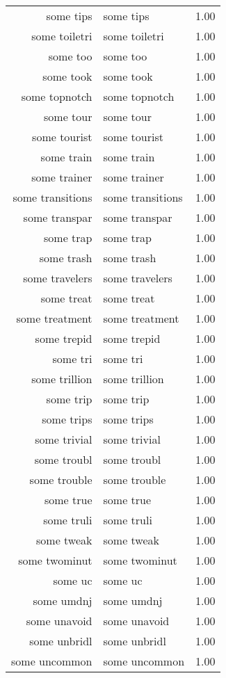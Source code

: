 \begin{table}[ht]
\begin{tabular}{rlr}
  some tips & some tips & 1.00 \\ 
  some toiletri & some toiletri & 1.00 \\ 
  some too & some too & 1.00 \\ 
  some took & some took & 1.00 \\ 
  some topnotch & some topnotch & 1.00 \\ 
  some tour & some tour & 1.00 \\ 
  some tourist & some tourist & 1.00 \\ 
  some train & some train & 1.00 \\ 
  some trainer & some trainer & 1.00 \\ 
  some transitions & some transitions & 1.00 \\ 
  some transpar & some transpar & 1.00 \\ 
  some trap & some trap & 1.00 \\ 
  some trash & some trash & 1.00 \\ 
  some travelers & some travelers & 1.00 \\ 
  some treat & some treat & 1.00 \\ 
  some treatment & some treatment & 1.00 \\ 
  some trepid & some trepid & 1.00 \\ 
  some tri & some tri & 1.00 \\ 
  some trillion & some trillion & 1.00 \\ 
  some trip & some trip & 1.00 \\ 
  some trips & some trips & 1.00 \\ 
  some trivial & some trivial & 1.00 \\ 
  some troubl & some troubl & 1.00 \\ 
  some trouble & some trouble & 1.00 \\ 
  some true & some true & 1.00 \\ 
  some truli & some truli & 1.00 \\ 
  some tweak & some tweak & 1.00 \\ 
  some twominut & some twominut & 1.00 \\ 
  some uc & some uc & 1.00 \\ 
  some umdnj & some umdnj & 1.00 \\ 
  some unavoid & some unavoid & 1.00 \\ 
  some unbridl & some unbridl & 1.00 \\ 
  some uncommon & some uncommon & 1.00 \\ 

\end{tabular}
\end{table}
